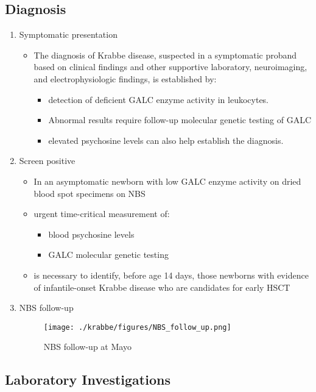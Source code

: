 \documentclass{scrartcl}
\begin{document}
\subsection{Diagnosis}
\label{sec:org41b477b}
\begin{enumerate}
\item Symptomatic presentation
\label{sec:org0a9a737}
\begin{itemize}
\item The diagnosis of Krabbe disease, suspected in a symptomatic proband
based on clinical findings and other supportive laboratory,
neuroimaging, and electrophysiologic findings, is established by:
\begin{itemize}
\item detection of deficient GALC enzyme activity in leukocytes.
\item Abnormal results require follow-up molecular genetic testing of GALC
\item elevated psychosine levels can also help establish the diagnosis.
\end{itemize}
\end{itemize}

\item Screen positive
\label{sec:org187fc61}
\begin{itemize}
\item In an asymptomatic newborn with low GALC enzyme activity
on dried blood spot specimens on NBS
\item urgent time-critical measurement of:
\begin{itemize}
\item blood psychosine levels
\item GALC molecular genetic testing
\end{itemize}
\item is necessary to identify, before age 14 days, those newborns with
evidence of infantile-onset Krabbe disease who are candidates for
early HSCT
\end{itemize}

\item NBS follow-up
\label{sec:org34b6c67}

\begin{figure}[htbp]
\centering
\texttt{[image: ./krabbe/figures/NBS\_follow\_up.png]}
\caption{\label{fig:orgf11dd7a}
NBS follow-up at Mayo}
\end{figure}
\end{enumerate}


\subsection{Laboratory Investigations}
\label{sec:orgdd990ca}
\end{document}
